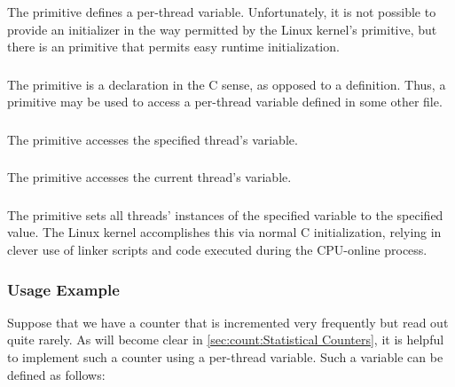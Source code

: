 The  primitive defines a per-thread variable.
Unfortunately, it is not possible to provide an initializer in the way
permitted by the Linux kernel's  primitive,
but there is an  primitive that permits easy
runtime initialization.

\subsubsection{}

The  primitive is a declaration in the C sense,
as opposed to a definition.
Thus, a  primitive may be used to access
a per-thread variable defined in some other file.

\subsubsection{}

The  primitive accesses the specified thread's variable.

\subsubsection{}

The  primitive accesses the current thread's variable.

\subsubsection{}

The  primitive sets all threads' instances of
the specified variable to the specified value.
The Linux kernel accomplishes this via normal C initialization,
relying in clever use of linker scripts and code executed during
the CPU-online process.

\subsubsection{Usage Example}

Suppose that we have a counter that is incremented very frequently
but read out quite rarely.
As will become clear in
\cref{sec:count:Statistical Counters},
it is helpful to implement such a counter using a per-thread variable.
Such a variable can be defined as follows:

